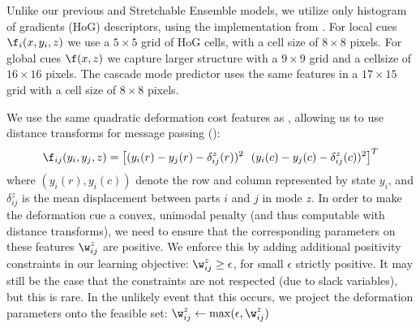 Unlike our previous \CPS and Stretchable Ensemble models, we utilize only 
histogram of gradients (HoG) descriptors, using the implementation from
\citet{dpm}.  For local cues $\f_i(x,y_i,z)$ we use a $5 \times 5$ grid of HoG 
cells, with a cell size of $8 \times 8$ pixels. For global cues $\f(x,z)$ we 
capture larger structure with a $9 \times 9$ grid and a cellsize of 
$16 \times 16$ pixels.   The cascade mode predictor uses the same features in a $17 \times 15$ grid with a cell size of $8 \times 8$ pixels.

 We use the same quadratic deformation cost features as \citet{felz05}, allowing us to use
distance transforms for message passing ():
$$
\f_{ij}(y_i,y_j,z) = \left[(y_i(r) - y_j(r) - \delta_{ij}^z(r))^2~~(y_i(c) - y_j(c) - \delta_{ij}^z(c))^2\right]^T
$$
where $(y_i(r),y_i(c))$ denote the row and column represented by state $y_i$, 
and $\delta_{ij}^z$ is the mean displacement between parts $i$ and $j$ in mode 
$z$.  In order to make the deformation cue a convex, unimodal penalty (and thus 
computable with distance transforms), we need to ensure that the corresponding 
parameters on these features $\w_{ij}^z$ are positive. We enforce this by 
adding additional positivity constraints in our learning objective: $\w_{ij}^z 
\geq \epsilon$, for small $\epsilon$ strictly positive.  It may still be the 
case that the constraints are not respected (due to slack variables), but this 
is rare.  In the unlikely event that this occurs, we project the deformation 
parameters onto the feasible set: $\w_{ij}^z \leftarrow 
\max(\epsilon,\w_{ij}^z)$ 


